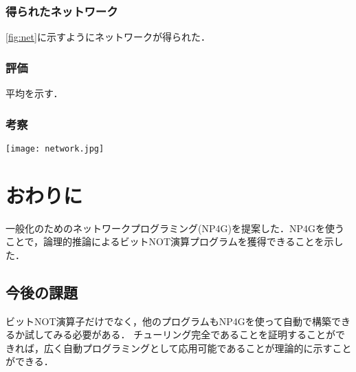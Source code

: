 \documentclass[exploratorypaper]{jsaiart} %
\begin{document}
\subsubsection{得られたネットワーク}
\ref{fig:net}に示すようにネットワークが得られた．
\subsubsection{評価}
平均を示す．
\subsubsection{考察}

\begin{figure*}[t]
    \begin{center}
        \texttt{[image: network.jpg]}
    \end{center}
    \capwidth=90mm %
    \caption{図の説明文... }
    \label{fig:net}
\end{figure*}

\section{おわりに}
一般化のためのネットワークプログラミング(NP4G)を提案した．NP4Gを使うことで，論理的推論によるビットNOT演算プログラムを獲得できることを示した．

\subsection{今後の課題}
ビットNOT演算子だけでなく，他のプログラムもNP4Gを使って自動で構築できるか試してみる必要がある．
チューリング完全であることを証明することができれば，広く自動プログラミングとして応用可能であることが理論的に示すことができる．





\begin{biography}
\end{biography}
\end{document}
